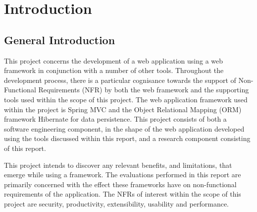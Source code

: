 \chapter{Introduction}
\label{intro}

\section{General Introduction}

This project concerns the development of a web application using a web framework in conjunction with a number of other tools. Throughout the development process, there is a particular cognisance towards the support of Non-Functional Requirements (NFR) by both the web framework and the supporting tools used within the scope of this project. The web application framework used within the project is Spring MVC and the Object Relational Mapping (ORM) framework Hibernate for data persistence. This project consists of both a software engineering component, in the shape of the web application developed using the tools discussed within this report, and a research component consisting of this report.

This project intends to discover any relevant benefits, and limitations, that emerge while using a framework. The evaluations performed in this report are primarily concerned with the effect these frameworks have on non-functional requirements of the application. The NFRs of interest within the scope of this project are security, productivity, extensibility, usability and performance. 

